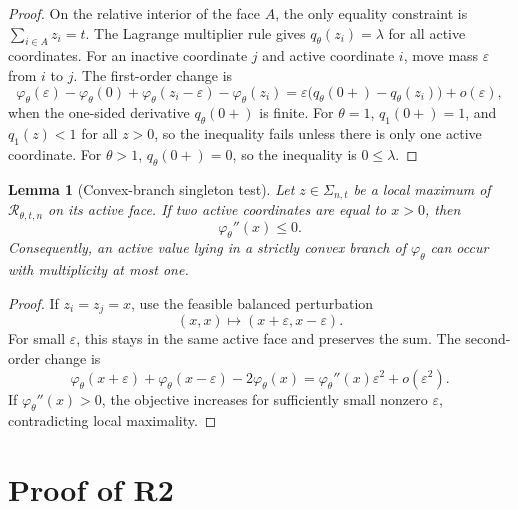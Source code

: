 \documentclass[11pt]{article}
\newtheorem{lemma}[theorem]{Lemma}
\theoremstyle{definition}
\begin{document}
\begin{proof}
On the relative interior of the face $A$, the only equality constraint is $\sum_{i\in A}z_i=t$.  The Lagrange multiplier rule gives $q_\theta(z_i)=\lambda$ for all active coordinates.  For an inactive coordinate $j$ and active coordinate $i$, move mass $\varepsilon$ from $i$ to $j$.  The first-order change is
\[
  \varphi_\theta(\varepsilon)-\varphi_\theta(0)
  +\varphi_\theta(z_i-\varepsilon)-\varphi_\theta(z_i)
  =\varepsilon\bigl(q_\theta(0+)-q_\theta(z_i)\bigr)+o(\varepsilon),
\]
when the one-sided derivative $q_\theta(0+)$ is finite.  For $\theta=1$, $q_1(0+)=1$, and $q_1(z)<1$ for all $z>0$, so the inequality fails unless there is only one active coordinate.  For $\theta>1$, $q_\theta(0+)=0$, so the inequality is $0\le\lambda$.
\end{proof}

\begin{lemma}[Convex-branch singleton test]\label{lem:singleton}
Let $z\in\Sigma_{n,t}$ be a local maximum of $\mathcal R_{\theta,t,n}$ on its active face.  If two active coordinates are equal to $x>0$, then
\[
  \varphi_\theta''(x)\le0.
\]
Consequently, an active value lying in a strictly convex branch of $\varphi_\theta$ can occur with multiplicity at most one.
\end{lemma}

\begin{proof}
If $z_i=z_j=x$, use the feasible balanced perturbation
\[
  (x,x)\mapsto(x+\varepsilon,x-\varepsilon).
\]
For small $\varepsilon$, this stays in the same active face and preserves the sum.  The second-order change is
\[
  \varphi_\theta(x+\varepsilon)+\varphi_\theta(x-\varepsilon)-2\varphi_\theta(x)
  =\varphi_\theta''(x)\varepsilon^2+o(\varepsilon^2).
\]
If $\varphi_\theta''(x)>0$, the objective increases for sufficiently small nonzero $\varepsilon$, contradicting local maximality.
\end{proof}

\section{Proof of R2}
\end{document}
